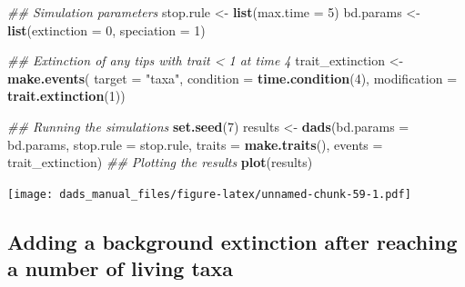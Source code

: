 \documentclass[]{book}
\newenvironment{Shaded}{\begin{snugshade}}{\end{snugshade}}
\newcommand{\CommentTok}[1]{\textcolor[rgb]{0.56,0.35,0.01}{\textit{#1}}}
\newcommand{\DataTypeTok}[1]{\textcolor[rgb]{0.13,0.29,0.53}{#1}}
\newcommand{\DecValTok}[1]{\textcolor[rgb]{0.00,0.00,0.81}{#1}}
\newcommand{\KeywordTok}[1]{\textcolor[rgb]{0.13,0.29,0.53}{\textbf{#1}}}
\newcommand{\NormalTok}[1]{#1}
\newcommand{\StringTok}[1]{\textcolor[rgb]{0.31,0.60,0.02}{#1}}
\begin{document}
\begin{Shaded}
\begin{Highlighting}[]
\CommentTok{## Simulation parameters}
\NormalTok{stop.rule <-}\StringTok{ }\KeywordTok{list}\NormalTok{(}\DataTypeTok{max.time =} \DecValTok{5}\NormalTok{)}
\NormalTok{bd.params <-}\StringTok{ }\KeywordTok{list}\NormalTok{(}\DataTypeTok{extinction =} \DecValTok{0}\NormalTok{, }\DataTypeTok{speciation =} \DecValTok{1}\NormalTok{)}

\CommentTok{## Extinction of any tips with trait < 1 at time 4}
\NormalTok{trait_extinction <-}\StringTok{ }\KeywordTok{make.events}\NormalTok{(}
                      \DataTypeTok{target =} \StringTok{"taxa"}\NormalTok{,}
                      \DataTypeTok{condition =} \KeywordTok{time.condition}\NormalTok{(}\DecValTok{4}\NormalTok{),}
                      \DataTypeTok{modification =} \KeywordTok{trait.extinction}\NormalTok{(}\DecValTok{1}\NormalTok{))}

\CommentTok{## Running the simulations}
\KeywordTok{set.seed}\NormalTok{(}\DecValTok{7}\NormalTok{)}
\NormalTok{results <-}\StringTok{ }\KeywordTok{dads}\NormalTok{(}\DataTypeTok{bd.params =}\NormalTok{ bd.params,}
                \DataTypeTok{stop.rule =}\NormalTok{ stop.rule,}
                \DataTypeTok{traits    =} \KeywordTok{make.traits}\NormalTok{(),}
                \DataTypeTok{events    =}\NormalTok{ trait_extinction)}
\CommentTok{## Plotting the results}
\KeywordTok{plot}\NormalTok{(results)}
\end{Highlighting}
\end{Shaded}

\texttt{[image: dads\_manual\_files/figure-latex/unnamed-chunk-59-1.pdf]}

\hypertarget{adding-a-background-extinction-after-reaching-a-number-of-living-taxa}{%
\subsection{Adding a background extinction after reaching a number of living taxa}\label{adding-a-background-extinction-after-reaching-a-number-of-living-taxa}}
\end{document}
